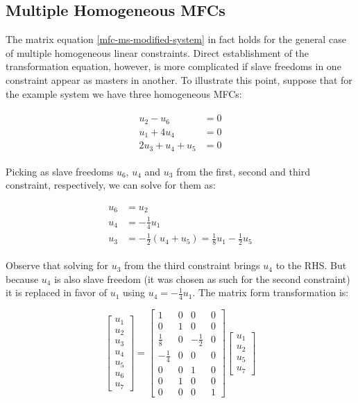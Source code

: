 \documentclass[10pt,b5paper,titlepage]{book}
\newenvironment{eqarray}
{
    \begin{eqnarray}
        \begin{aligned}
}
{
        \end{aligned}
    \end{eqnarray}
}
\begin{document}
\subsection{Multiple Homogeneous MFCs}

The matrix equation \eqref{mfc-ms-modified-system} in fact holds for the general
case of multiple homogeneous linear constraints. Direct establishment of the transformation
equation, however, is more complicated if slave freedoms in one constraint appear as masters
in another. To illustrate this point, suppose that for the example system we have three
homogeneous MFCs:

\begin{eqarray}\label{mfc-ms-3-constraints}
    u_2 - u_6 &= 0 \\
    u_1 + 4 u_4 &= 0 \\
    2 u_3 + u_4 + u_5 &= 0
\end{eqarray}

Picking as slave freedoms $ u_6 $, $ u_4 $ and $ u_3 $ from the first, second and third
constraint, respectively, we can solve for them as:

\begin{eqarray}
    u_6 &= u_2 \\
    u_4 &= -\frac{1}{4} u_1 \\
    u_3 &= -\frac{1}{2} \left( u_4 + u_5 \right) = \frac{1}{8} u_1 - \frac{1}{2} u_5
\end{eqarray}

Observe that solving for $ u_3 $ from the third constraint brings $ u_4 $ to the RHS.
But because $ u_4 $ is also slave freedom (it was chosen as such for the second constraint)
it is replaced in favor of $ u_1 $ using $ u_4 = -\frac{1}{4} u_1 $. The matrix form
transformation is:

\begin{equation}\label{mfc-ms-multiple-freedoms}
    \begin{bmatrix}
        u_1 \\
        u_2 \\
        u_3 \\
        u_4 \\
        u_5 \\
        u_6 \\
        u_7
    \end{bmatrix}
    = \begin{bmatrix}
        1 & 0 & 0 & 0 \\
        0 & 1 & 0 & 0 \\
        \frac{1}{8} & 0 & -\frac{1}{2} & 0 \\
        -\frac{1}{4} & 0 & 0 & 0 \\
        0 & 0 & 1 & 0 \\
        0 & 1 & 0 & 0 \\
        0 & 0 & 0 & 1
    \end{bmatrix}
    \begin{bmatrix}
        u_1 \\
        u_2 \\
        u_5 \\
        u_7
    \end{bmatrix}
\end{equation}
\end{document}
